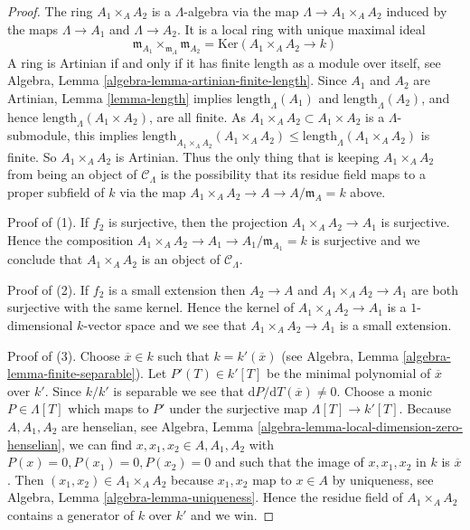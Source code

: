 \begin{proof}
The ring $A_1 \times_A A_2$ is a $\Lambda$-algebra via  the map
$\Lambda \to A_1 \times_A A_2$ induced by the maps
$\Lambda \to A_1$ and $\Lambda \to A_2$. It is a local ring with unique
maximal ideal
$$
\mathfrak m_{A_1} \times_{\mathfrak m_A} \mathfrak m_{A_2} =
\text{Ker}(A_1 \times_A A_2 \longrightarrow k)
$$
A ring is Artinian if and only if it has finite length as a module
over itself, see
Algebra, Lemma \ref{algebra-lemma-artinian-finite-length}.
Since $A_1$ and $A_2$ are Artinian, Lemma \ref{lemma-length} implies 
$\text{length}_\Lambda(A_1)$ and $\text{length}_\Lambda(A_2)$, 
and hence $\text{length}_\Lambda(A_1 \times A_2)$, are all finite.  As 
$A_1 \times_A A_2 \subset A_1 \times A_2$ is a $\Lambda$-submodule, this 
implies
$\text{length}_{A_1 \times_A A_2}(A_1 \times_A A_2) \leq
\text{length}_\Lambda(A_1 \times_A A_2)$ is finite. So $A_1 
\times_{A} A_2$ is Artinian. Thus the only thing that is keeping
$A_1 \times_A A_2$ from being an object of $\mathcal{C}_\Lambda$ is
the possibility that its residue field maps to a proper subfield of $k$
via the map $A_1 \times_A A_2 \to A \to A/\mathfrak m_A = k$ above.

\medskip \noindent
Proof of (1). If $f_2$ is surjective, then the projection
$A_1 \times_A A_2 \to A_1$ is surjective. Hence the composition
$A_1 \times_A A_2 \to A_1 \to A_1/\mathfrak m_{A_1} = k$ is surjective
and we conclude that $A_1 \times_A A_2$ is an object of $\mathcal{C}_\Lambda$.

\medskip\noindent
Proof of (2). If $f_2$ is a small extension then $A_2 \to A$ and
$A_1 \times_A A_2  \to A_1$ are both surjective with the same kernel.
Hence the kernel of $A_1 \times_A A_2  \to A_1$ is a $1$-dimensional
$k$-vector space and we see that $A_1 \times_A A_2  \to A_1$ is a small
extension.

\medskip\noindent
Proof of (3). Choose $\overline{x} \in k$ such that
$k = k'(\overline{x})$ (see
Algebra, Lemma \ref{algebra-lemma-finite-separable}).
Let $P'(T) \in k'[T]$ be the minimal polynomial of $\overline{x}$ over $k'$.
Since $k/k'$ is separable we see that
$\text{d}P/\text{d}T(\overline{x}) \not = 0$.
Choose a monic $P \in \Lambda[T]$ which maps to $P'$ under the surjective map
$\Lambda[T] \to k'[T]$. Because $A, A_1, A_2$ are henselian, see
Algebra, Lemma \ref{algebra-lemma-local-dimension-zero-henselian},
we can find $x, x_1, x_2 \in A, A_1, A_2$ with $P(x) = 0, P(x_1) = 0,
P(x_2) = 0$ and such that the image of $x, x_1, x_2$ in $k$ is $\overline{x}$.
Then $(x_1, x_2) \in A_1 \times_A A_2$ because $x_1, x_2$
map to $x \in A$ by uniqueness, see
Algebra, Lemma \ref{algebra-lemma-uniqueness}.
Hence the residue field of
$A_1 \times_A A_2$ contains a generator of $k$ over $k'$ and we win.
\end{proof}

